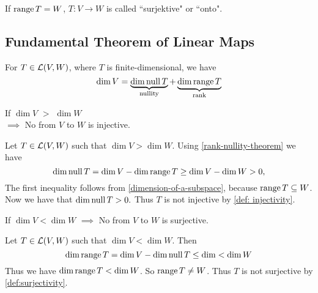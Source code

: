 \setcounter{thm}{18}
\begin{mydef} [surjectivity]
  \label{def:surjectivity}
  If $\operatorname{range} T=W$, $T:V\to W$ is called ``surjektive" or ``onto".
\end{mydef}

\subsection{Fundamental Theorem of Linear Maps}
  \setcounter{thm}{20}
  \begin{thm} 
    \label{rank-nullity-theorem}
    For $T \in {\mathcal{L}(V,W)}$, where $T$ is finite-dimensional, we have
    \begin{equation}
      \dim V =
      \underbrace{ \dim \operatorname{null} T }_{\text{nullity}}
      + \underbrace{\dim \operatorname{range} T}_{\text{rank}}
    \end{equation}
  \end{thm}

  \setcounter{thm}{21}
  \begin{thm} 
    \label{thm: linear-map-to-a-lower-dimensional-space-is-not-injective}
    If $\dim V$ $>$ $\dim W$ \\ 
    $\implies$ No \lm from $V$ to $W$ is injective.
  \end{thm}
  \begin{prf} Let $T\in \mathcal{L}(V,W)$ such that $\dim V > \dim W$. Using \ref{rank-nullity-theorem} we have
    \begin{equation}
      \dim \operatorname{null} T = \dim V - \dim \operatorname{range} T \geq \dim V - \dim W > 0,
    \end{equation}
    The first inequality follows from \ref{dimension-of-a-subspace}, because $\operatorname{range} T \subseteq W$. Now we have that $\dim \operatorname{null} T > 0.$ Thus $T$ is not injective by \autoref{def: injectivity}.
  \end{prf}

  \setcounter{thm}{23}
  \begin{thm} 
    If $\dim V < \dim W$ $\implies$ No \lm from $V$ to $W$ is surjective.
  \end{thm}
  \begin{prf}
    Let $T\in \mathcal{L} (V,W)$ such that $\dim V < \dim W$. Then
    \begin{equation}
      \dim \operatorname{range} T = \dim V - \dim \operatorname{null} T \leq \dim < \dim W
    \end{equation}
    Thus we have $\dim \operatorname{range} T < \dim W$. So $\operatorname{range} T \neq W$. Thus $T$ is not surjective by \autoref{def:surjectivity}.
  \end{prf}
   
